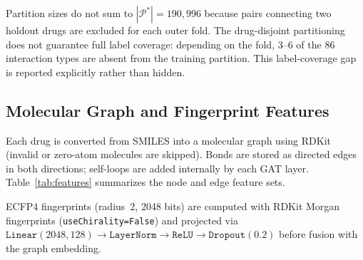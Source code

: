 \documentclass[11pt,a4paper,twocolumn]{article}
\begin{document}
Partition sizes do not sum to $|\mathcal{P}^{\ast}| = 190{,}996$ because
pairs connecting two holdout drugs are excluded for each outer fold.
The drug-disjoint partitioning does not guarantee full label coverage:
depending on the fold, 3--6 of the 86 interaction types are absent from
the training partition.
This label-coverage gap is reported explicitly rather than hidden.

\subsection{Molecular Graph and Fingerprint Features}
Each drug is converted from SMILES into a molecular graph using RDKit
(invalid or zero-atom molecules are skipped).
Bonds are stored as directed edges in both directions; self-loops are added
internally by each GAT layer.
Table~\ref{tab:features} summarizes the node and edge feature sets.

\begin{table}[H]
\centering
\caption{Molecular graph feature summary.}
\label{tab:features}
\end{table}

ECFP4 fingerprints (radius~2, 2048 bits) \cite{rogers2010ecfp} are computed
with RDKit Morgan fingerprints (\texttt{useChirality=False}) and projected via
$\texttt{Linear}(2048,128) \!\to\! \texttt{LayerNorm} \!\to\!
\texttt{ReLU} \!\to\! \texttt{Dropout}(0.2)$
before fusion with the graph embedding.
\end{document}
